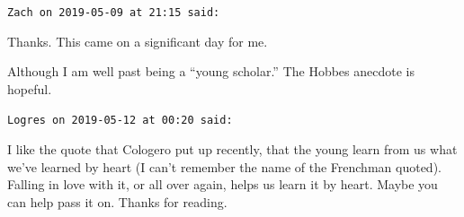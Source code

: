 \begin{footnotesize}
\begin{sffamily}
\texttt{Zach on 2019-05-09 at 21:15 said:}

Thanks. This came on a significant day for me.

Although I am well past being a ``young scholar.'' The Hobbes anecdote is hopeful.

\hfill

\texttt{Logres on 2019-05-12 at 00:20 said:}

I like the quote that Cologero put up recently, that the young learn from us what we've learned by heart (I can't remember the name of the Frenchman quoted). Falling in love with it, or all over again, helps us learn it by heart. Maybe you can help pass it on. Thanks for reading.

\end{sffamily}
\end{footnotesize}

